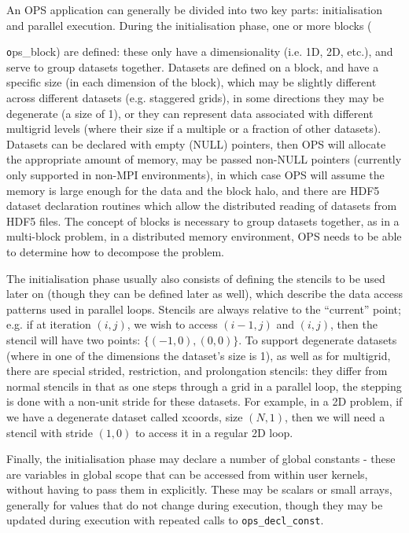 \documentclass[11pt]{article}
\begin{document}
An OPS application can generally be divided into two key parts: initialisation and parallel execution. During the
initialisation phase, one or more blocks ({\texttt ops\_block) are defined: these only have a dimensionality (i.e. 1D, 2D,
etc.), and serve to group datasets together. Datasets are defined on a block, and have a specific size (in each dimension of the block), which may be
slightly different across different datasets (e.g. staggered grids), in some directions they may be degenerate (a
 size of 1), or they can represent data associated with different multigrid levels (where their size if a multiple or
a fraction of other datasets). Datasets can be declared with empty (NULL) pointers, then OPS will allocate the appropriate
amount of memory, may be passed non-NULL pointers (currently only supported in non-MPI environments), in which case OPS will
assume the memory is large enough for the data and the block halo, and there are HDF5 dataset declaration routines which
allow the distributed reading of datasets from HDF5 files. The concept of blocks is necessary to group datasets together, 
as in a multi-block problem, in a distributed memory environment, OPS needs to be able to determine how to decompose the problem.

The initialisation phase usually also consists of defining the stencils to be used later on (though they can be defined later as well),
which describe the data access patterns used in parallel loops. Stencils are always relative to the ``current'' point; e.g. if
at iteration $(i,j)$, we wish to access $(i{-}1,j)$ and $(i,j)$, then the stencil will have two points: $\{(-1, 0), (0, 0)\}$. To 
support degenerate datasets (where in one of the dimensions the dataset's size is 1), as well as for multigrid, there are
special strided, restriction, and prolongation stencils: they differ from normal stencils in that as one steps through a
grid in a parallel loop, the stepping is done with a non-unit stride for these datasets. For example, in a 2D problem, if
we have a degenerate dataset called xcoords, size $(N,1)$, then we will need a stencil with stride $(1,0)$ to access it in a
regular 2D loop.

Finally, the initialisation phase may declare a number of global constants - these are variables in global scope that can 
be accessed from within user kernels, without having to pass them in explicitly. These may be scalars or small arrays, 
generally for values that do not change during execution, though they may be updated during execution with repeated calls
to {\tt ops\_decl\_const}. 

}
\end{document}
